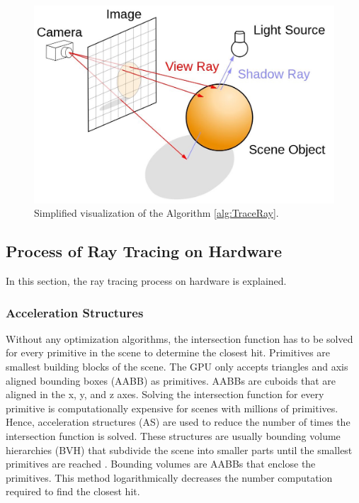 \documentclass[12pt]{article}
\begin{document}
\begin{figure}[H]
    \begin{center}
        \includegraphics[scale=0.22]{RayTracingImage}
    \end{center}
    \caption{Simplified visualization of the Algorithm \ref{alg:TraceRay}. \parencite{NVIDIA:Raytracing}}
    \label{fig:RayTracingImage}
\end{figure}

\subsection{Process of Ray Tracing on Hardware}
In this section, the ray tracing process on hardware is explained.

\subsubsection{Acceleration Structures}
Without any optimization algorithms, the intersection function has to be solved for every primitive in the scene to determine the closest hit. 
Primitives are smallest building blocks of the scene. The GPU only accepts triangles and axis aligned bounding boxes (AABB) as primitives.
AABBs are cuboids that are aligned in the x, y, and z axes.
Solving the intersection function for every primitive is computationally expensive for scenes with millions of primitives.
Hence, acceleration structures (AS) are used to reduce the number of times the intersection function is solved.
These structures are usually bounding volume hierarchies (BVH) that subdivide the scene into smaller parts until the smallest primitives are reached \parencite{NVIDIA:Raytracing}.
Bounding volumes are AABBs that enclose the primitives.
This method logarithmically decreases the number computation required to find the closest hit.
\end{document}
